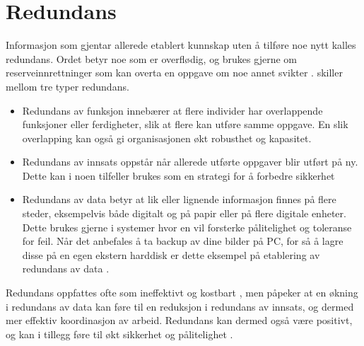 \section{Redundans}
\label{sec:redundans}

Informasjon som gjentar allerede etablert kunnskap uten å tilføre noe nytt kalles redundans. Ordet betyr noe som er overflødig, og brukes gjerne om reserveinnrettninger som kan overta en oppgave om noe annet svikter \citep{Rosness}. \citet{Cabitza} skiller mellom tre typer redundans. 

\begin{itemize}
\item Redundans av funksjon innebærer at flere individer har overlappende funksjoner eller ferdigheter, slik at flere kan utføre samme oppgave. En slik overlapping kan også gi organisasjonen økt robusthet og kapasitet.
\item Redundans av innsats oppstår når allerede utførte oppgaver blir utført på ny. Dette kan i noen tilfeller brukes som en strategi for å forbedre sikkerhet \citep{Rygh13}
\item Redundans av data betyr at lik eller lignende informasjon finnes på flere steder, eksempelvis både digitalt og på papir eller på flere digitale enheter. Dette brukes gjerne i systemer hvor en vil forsterke pålitelighet og toleranse for feil. Når det anbefales å ta backup av dine bilder på PC, for så å lagre disse på en egen ekstern harddisk er dette eksempel på etablering av redundans av data \citep{Rygh13}.
\end{itemize}
 
\noindent
Redundans oppfattes ofte som ineffektivt og kostbart \citep{Rygh13}, men \citet{Cabitza} påpeker at en økning i redundans av data kan føre til en reduksjon i redundans av innsats, og dermed mer effektiv koordinasjon av arbeid. Redundans kan dermed også være positivt, og kan i tillegg føre til økt sikkerhet og pålitelighet \citep{Rygh13}.
